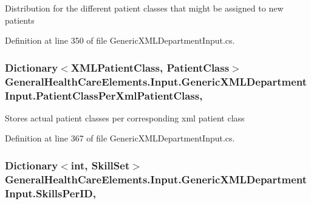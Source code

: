 Distribution for the different patient classes that might be assigned to new patients 



Definition at line 350 of file Generic\+X\+M\+L\+Department\+Input.\+cs.

\subsubsection[{\texorpdfstring{Patient\+Class\+Per\+Xml\+Patient\+Class}{PatientClassPerXmlPatientClass}}]{\setlength{\rightskip}{0pt plus 5cm}Dictionary$<${\bf X\+M\+L\+Patient\+Class}, {\bf Patient\+Class}$>$ General\+Health\+Care\+Elements.\+Input.\+Generic\+X\+M\+L\+Department\+Input.\+Patient\+Class\+Per\+Xml\+Patient\+Class\hspace{0.3cm}{\ttfamily [get]}, {\ttfamily [set]}}\hypertarget{class_general_health_care_elements_1_1_input_1_1_generic_x_m_l_department_input_af111104d55be634fabc4d61a344fa0a6}{}\label{class_general_health_care_elements_1_1_input_1_1_generic_x_m_l_department_input_af111104d55be634fabc4d61a344fa0a6}


Stores actual patient classes per corresponding xml patient class 



Definition at line 367 of file Generic\+X\+M\+L\+Department\+Input.\+cs.

\subsubsection[{\texorpdfstring{Skills\+Per\+ID}{SkillsPerID}}]{\setlength{\rightskip}{0pt plus 5cm}Dictionary$<$int, {\bf Skill\+Set}$>$ General\+Health\+Care\+Elements.\+Input.\+Generic\+X\+M\+L\+Department\+Input.\+Skills\+Per\+ID\hspace{0.3cm}{\ttfamily [get]}, {\ttfamily [set]}}\hypertarget{class_general_health_care_elements_1_1_input_1_1_generic_x_m_l_department_input_aa0c1631305a078b35d988b290cb7e241}{}\label{class_general_health_care_elements_1_1_input_1_1_generic_x_m_l_department_input_aa0c1631305a078b35d988b290cb7e241}


